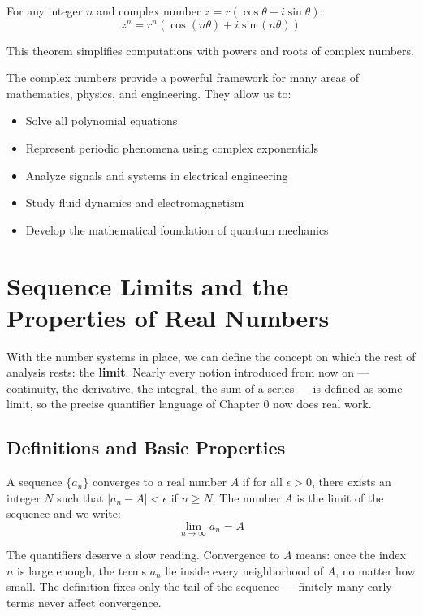 \begin{theorem}
For any integer $n$ and complex number $z = r(\cos\theta + i\sin\theta)$:
\[
z^n = r^n(\cos(n\theta) + i\sin(n\theta))
\]
\end{theorem}

This theorem simplifies computations with powers and roots of complex numbers.

The complex numbers provide a powerful framework for many areas of mathematics, physics, and engineering. They allow us to:
\begin{itemize}
    \item Solve all polynomial equations
    \item Represent periodic phenomena using complex exponentials
    \item Analyze signals and systems in electrical engineering
    \item Study fluid dynamics and electromagnetism
    \item Develop the mathematical foundation of quantum mechanics
\end{itemize}

\section{Sequence Limits and the Properties of Real Numbers}

With the number systems in place, we can define the concept on which the rest of analysis rests: the \textbf{limit}. Nearly every notion introduced from now on — continuity, the derivative, the integral, the sum of a series — is defined as some limit, so the precise quantifier language of Chapter 0 now does real work.

\subsection{Definitions and Basic Properties}

\begin{definition}
A sequence $\{a_n\}$ converges to a real number $A$ if for all $\epsilon > 0$, there exists an integer $N$ such that $|a_n - A|<\epsilon$ if $n\ge N$. The number $A$ is the limit of the sequence and we write:
\[\lim_{n \to \infty} a_n = A\]
\end{definition}
The quantifiers deserve a slow reading. Convergence to $A$ means: once the index $n$ is large enough, the terms $a_n$ lie inside every neighborhood of $A$, no matter how small. The definition fixes only the tail of the sequence — finitely many early terms never affect convergence.

